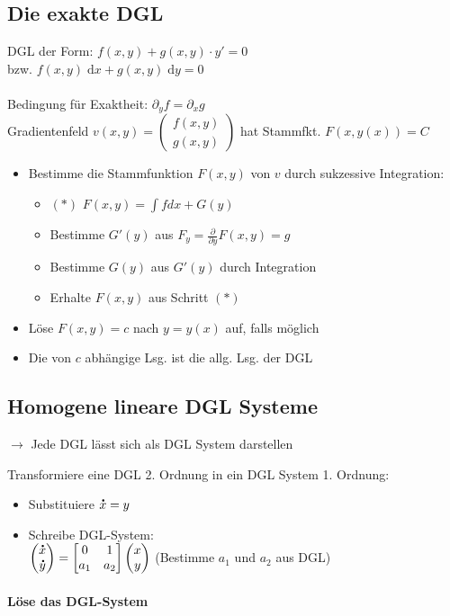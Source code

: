 \documentclass[6pt,a4paper]{scrartcl}
\newcommand{\mat}[1]{\ensuremath{\begin{bmatrix} #1 \end{bmatrix}}}								%
\newcommand{\vect}[1]{\ensuremath{\begin{pmatrix} #1 \end{pmatrix}}}							%
\renewcommand*{\dot}[1]{\accentset{\mbox{\textrm{\large\bfseries .}} }{#1}}						%
\newcommand{\ra}[0]{\ensuremath{\rightarrow}} 									%
\newcommand{\diff}{\ensuremath{\;\mathrm d}}									%
\begin{document}
\begin{multicols*}{4}
\subsection{Die exakte DGL}
DGL der Form: $\boxed{f(x,y) + g(x,y) \cdot y' = 0}$ \\   
bzw. $f(x,y) \diff x + g(x,y) \diff y = 0$\\ \\
Bedingung für Exaktheit: $\partial_y f = \partial_x g$\\
Gradientenfeld $v(x,y) = \vect{f(x,y) \\ g(x,y)}$ hat Stammfkt. $F(x,y(x)) = C$
\begin{itemize}\itemsep-4pt 
	\item Bestimme die Stammfunktion $F(x,y)$ von $v$ durch sukzessive Integration:
	\begin{itemize}
		\item $(*)$ $F(x,y) = \int f dx + G(y)$
		\item Bestimme $G'(y)$ aus $F_y = \frac{\partial}{\partial y} F(x,y) = g$
		\item Bestimme $G(y)$ aus $G'(y)$ durch Integration
		\item Erhalte $F(x,y)$ aus Schritt $(*)$
	\end{itemize}
	\item Löse $F(x,y) = c$ nach $y = y(x)$ auf, falls möglich
	\item Die von $c$ abhängige Lsg. ist die allg. Lsg. der DGL
\end{itemize}

\subsection{Homogene lineare DGL Systeme}
$\ra$ Jede DGL lässt sich als DGL System darstellen

Transformiere eine DGL 2. Ordnung in ein DGL System 1. Ordnung:
\begin{itemize}
	\item Substituiere $\dot x = y$
	\item Schreibe DGL-System: \\
	$\vect{\dot x \\  \dot y} = \mat{ 0 & 1 \\ a_1 & a_2} \vect{x \\ y}$ (Bestimme $a_1$ und $a_2$ aus DGL)
\end{itemize}

\paragraph{Löse das DGL-System}


\end{multicols*}
\end{document}
